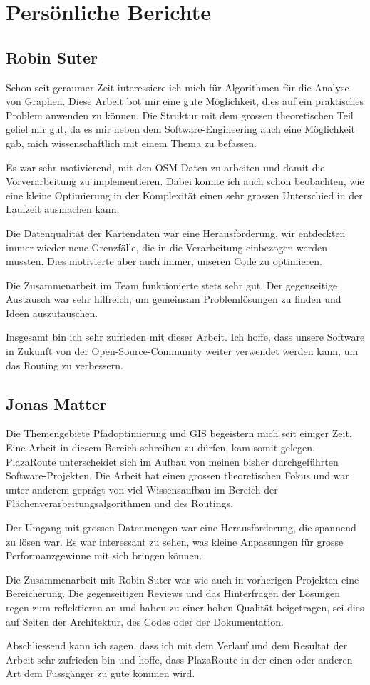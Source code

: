 
\section{Persönliche Berichte}
\label{sub:Persönliche Berichte}

\subsection{Robin Suter}
\label{Persönliche Berichte:Robin Suter}
Schon seit geraumer Zeit interessiere ich mich für Algorithmen für die Analyse von Graphen. Diese Arbeit bot mir eine gute Möglichkeit, dies auf ein praktisches Problem anwenden zu können. Die Struktur mit dem grossen theoretischen Teil gefiel mir gut, da es mir neben dem Software-Engineering auch eine Möglichkeit gab, mich wissenschaftlich mit einem Thema zu befassen.

Es war sehr motivierend, mit den \ac{OSM}-Daten zu arbeiten und damit die Vorverarbeitung zu implementieren. Dabei konnte ich auch schön beobachten, wie eine kleine Optimierung in der Komplexität einen sehr grossen Unterschied in der Laufzeit ausmachen kann.

Die Datenqualität der Kartendaten war eine Herausforderung, wir entdeckten immer wieder neue Grenzfälle, die in die Verarbeitung einbezogen werden mussten. Dies motivierte aber auch immer, unseren Code zu optimieren.

Die Zusammenarbeit im Team funktionierte stets sehr gut. Der gegenseitige Austausch war sehr hilfreich, um gemeinsam Problemlösungen zu finden und Ideen auszutauschen.

Insgesamt bin ich sehr zufrieden mit dieser Arbeit. Ich hoffe, dass unsere Software in Zukunft von der Open-Source-Community weiter verwendet werden kann, um das Routing zu verbessern.


\subsection{Jonas Matter}
\label{Persönliche Berichte:Jonas Matter}
Die Themengebiete Pfadoptimierung und \ac{GIS} begeistern mich seit einiger Zeit. Eine Arbeit in diesem Bereich schreiben zu dürfen, kam somit gelegen. PlazaRoute unterscheidet sich im Aufbau von meinen bisher durchgeführten Software-Projekten. Die Arbeit hat einen grossen theoretischen Fokus und war unter anderem geprägt von viel Wissensaufbau im Bereich der Flächenverarbeitungsalgorithmen und des Routings. 

Der Umgang mit grossen Datenmengen war eine Herausforderung, die spannend zu lösen war. Es war interessant zu sehen, was kleine Anpassungen für grosse Performanzgewinne mit sich bringen können.

Die Zusammenarbeit mit Robin Suter war wie auch in vorherigen Projekten eine Bereicherung. Die gegenseitigen Reviews und das Hinterfragen der Lösungen regen zum reflektieren an und haben zu einer hohen Qualität beigetragen, sei dies auf Seiten der Architektur, des Codes oder der Dokumentation.

Abschliessend kann ich sagen, dass ich mit dem Verlauf und dem Resultat der Arbeit sehr zufrieden bin und hoffe, dass PlazaRoute in der einen oder anderen Art dem Fussgänger zu gute kommen wird.